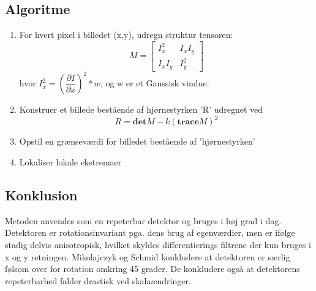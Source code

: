 \subsection*{Algoritme}
\begin{enumerate}
\item{ For hvert pixel i billedet (x,y), udregn struktur tensoren: $$ M = \begin{bmatrix}
I_x^2 & I_xI_y \\
I_xI_y & I_y^2
\end{bmatrix} $$hvor $ I_x^2 = (\dfrac{\partial I}{\partial x})^2 \ast w$, og w er et Gaussisk vindue.}
\item{ Konstruer et billede bestående af hjørnestyrken 'R' udregnet ved $$ R = \textbf{det}M-k(\textbf{trace}M)^2 $$  }
\item{ Opstil en grænseværdi for billedet bestående af 'hjørnestyrken'}
\item{ Lokaliser lokale ekstremaer }
\end{enumerate}
\subsection*{Konklusion}
Metoden anvendes som en repeterbar detektor og bruges i høj grad i dag. Detektoren er rotationsinvariant pga. dens brug af egenværdier, men er ifølge \cite{eval} stadig delvis anisotropisk, hvilket skyldes differentierings filtrene der kun bruges i x og y retningen. Mikolajczyk og Schmid \cite{eval} konkludere at detektoren er særlig følsom over for rotation omkring 45 grader. De konkludere også at detektorens repeterbarhed falder drastisk ved skalaændringer.

